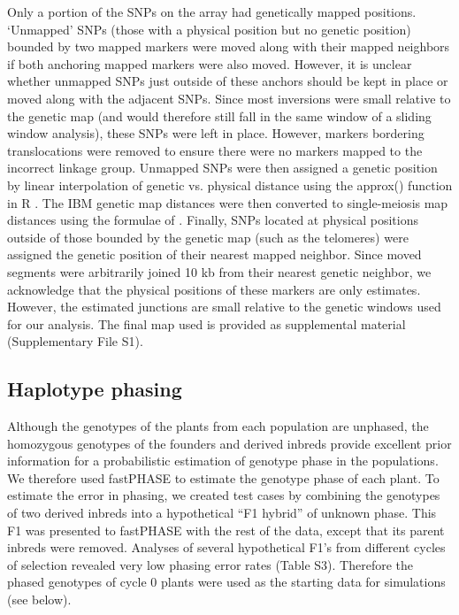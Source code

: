 \documentclass[twocolumn,twoside,letterpaper]{article}
\begin{document}
Only a portion of the SNPs on the array had genetically mapped positions. 
‘Unmapped’ SNPs (those with a physical position but no genetic position) bounded by two mapped markers were moved along with their mapped neighbors if both anchoring mapped markers were also moved. 
However, it is unclear whether unmapped SNPs just outside of these anchors should be kept in place or moved along with the adjacent SNPs. 
Since most inversions were small relative to the genetic map (and would therefore still fall in the same window of a sliding window analysis), these SNPs were left in place. 
However, markers bordering translocations were removed to ensure there were no markers mapped to the incorrect linkage group. 
Unmapped SNPs were then assigned a genetic position by linear interpolation of genetic vs. physical distance using the approx() function in R \citep{rteam}. 
The IBM genetic map distances were then converted to single-meiosis map distances using the formulae of \citet{winkler2003determination}. 
Finally, SNPs located at physical positions outside of those bounded by the genetic map (such as the telomeres) were assigned the genetic position of their nearest mapped neighbor. 
Since moved segments were arbitrarily joined 10 kb from their nearest genetic neighbor, we acknowledge that the physical positions of these markers are only estimates. 
However, the estimated junctions are small relative to the genetic windows used for our analysis. 
The final map used is provided as supplemental material (Supplementary File S1).
	
\subsection*{Haplotype phasing}
Although the genotypes of the plants from each population are unphased, the homozygous genotypes of the founders and derived inbreds provide excellent prior information for a probabilistic estimation of genotype phase in the populations. 
We therefore used fastPHASE \citep{scheet2006fast} to estimate the genotype phase of each plant. To estimate the error in phasing, we created test cases by combining the genotypes of two derived inbreds into a hypothetical “F1 hybrid” of unknown phase. 
This F1 was presented to fastPHASE with the rest of the data, except that its parent inbreds were removed. 
Analyses of several hypothetical F1’s from different cycles of selection revealed very low phasing error rates (Table S3). 
Therefore the phased genotypes of cycle 0 plants were used as the starting data for simulations (see below).
\end{document}
